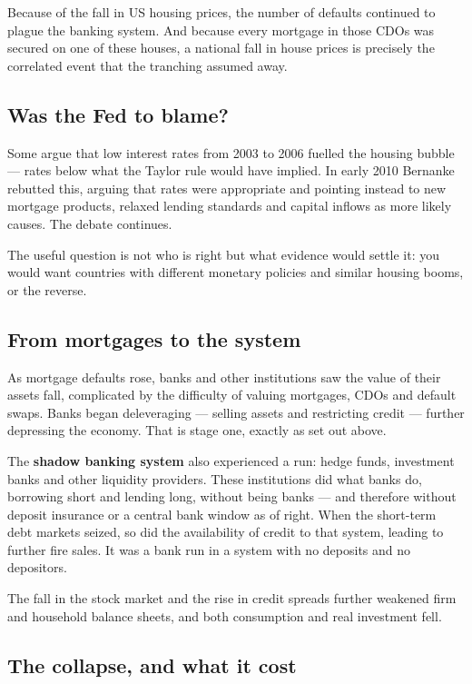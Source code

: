 \documentclass[11pt,a4paper]{article}
\begin{document}
Because of the fall in US housing prices, the number of defaults continued to
plague the banking system. And because every mortgage in those CDOs was secured
on one of these houses, a national fall in house prices is precisely the
correlated event that the tranching assumed away.

\subsection*{Was the Fed to blame?}

Some argue that low interest rates from 2003 to 2006 fuelled the housing bubble
--- rates below what the Taylor rule would have implied. In early 2010 Bernanke
rebutted this, arguing that rates were appropriate and pointing instead to new
mortgage products, relaxed lending standards and capital inflows as more likely
causes. The debate continues.

The useful question is not who is right but what evidence would settle it: you
would want countries with different monetary policies and similar housing booms,
or the reverse.

\subsection*{From mortgages to the system}

As mortgage defaults rose, banks and other institutions saw the value of their
assets fall, complicated by the difficulty of valuing mortgages, CDOs and
default swaps. Banks began deleveraging --- selling assets and restricting
credit --- further depressing the economy. That is stage one, exactly as set out
above.

The \textbf{shadow banking system} also experienced a run: hedge funds,
investment banks and other liquidity providers. These institutions did what
banks do, borrowing short and lending long, without being banks --- and
therefore without deposit insurance or a central bank window as of right. When
the short-term debt markets seized, so did the availability of credit to that
system, leading to further fire sales. It was a bank run in a system with no
deposits and no depositors.

The fall in the stock market and the rise in credit spreads further weakened
firm and household balance sheets, and both consumption and real investment
fell.

\subsection*{The collapse, and what it cost}
\end{document}
